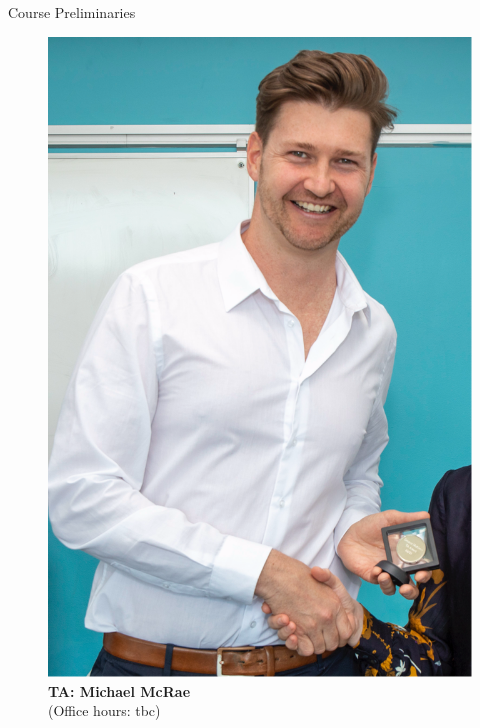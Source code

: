 \documentclass[11pt,english]{beamer}
\begin{document}
\begin{frame}{Course Preliminaries}
\begin{figure}
\begin{minipage}{0.45\textwidth}
			\includegraphics[width=\textwidth, trim=0 250 0 0, clip]{headshot_mcrae.png} %
			\caption*{\textbf{TA: Michael McRae} \\ (Office hours: tbc)}
		\end{minipage}
	\end{figure}

\end{frame}
\end{document}
